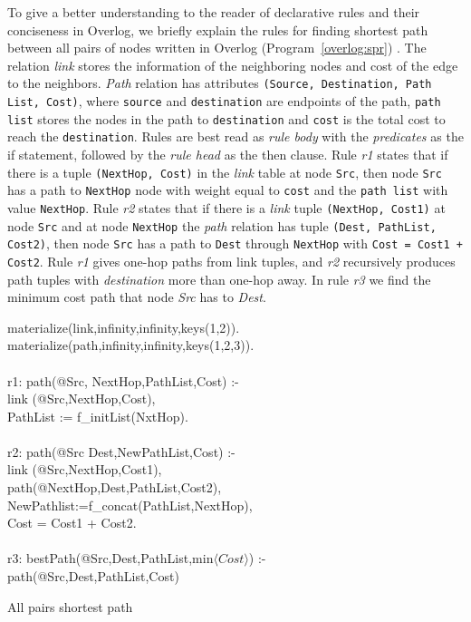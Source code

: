 To give a better understanding to the reader of declarative rules and their conciseness in Overlog, we briefly explain the rules for finding shortest path between all pairs of nodes written in Overlog (Program~\ref{overlog:spr}) . The relation \emph{link} stores the information of the neighboring nodes and cost of the edge to the neighbors. \emph{Path} relation has attributes \texttt{(Source, Destination, Path List, Cost)}, where \texttt{source} and \texttt{destination} are endpoints of the path, \texttt{path list} stores the nodes in the path to \texttt{destination} and \texttt{cost} is the total cost to reach the \texttt{destination}. Rules are best read as \emph{rule body} with the \emph{predicates} as the if statement, followed by the \emph{rule head }as the then clause. Rule \emph{r1} states that if there is a tuple \texttt{(NextHop, Cost)} in the \emph{link} table at node \texttt{Src}, then node \texttt{Src} has a path to \texttt{NextHop} node with weight equal to \texttt{cost} and the \texttt{path list} with value \texttt{NextHop}. Rule \emph{r2} states that if there is a \emph{link} tuple \texttt{(NextHop, Cost1)} at node \texttt{Src} and at node \texttt{NextHop} the \emph{path} relation has tuple \texttt{(Dest, PathList, Cost2)}, then node \texttt{Src} has a path to \texttt{Dest} through \texttt{NextHop} with \texttt{Cost = Cost1 + Cost2}. Rule \emph{r1} gives one-hop paths from link tuples, and \emph{r2} recursively produces path tuples with \emph{destination} more than one-hop away. In rule \emph{r3} we find the minimum cost path that node \emph{Src} has to \emph{Dest}.

\begin{Overlog}
\small{
materialize(link,infinity,infinity,keys(1,2)).\\
materialize(path,infinity,infinity,keys(1,2,3)).\\
\\
r1: path(@Src, NextHop,PathList,Cost) :-\\
\phantom{30} link (@Src,NextHop,Cost),\\
\phantom{30} PathList := f\_initList(NxtHop).\\\\
r2: path(@Src Dest,NewPathList,Cost) :-\\
\phantom{30} link (@Src,NextHop,Cost1),\\
\phantom{30} path(@NextHop,Dest,PathList,Cost2),\\
\phantom{30} NewPathlist:=f\_concat(PathList,NextHop),\\
\phantom{30} Cost = Cost1 + Cost2.\\\\
r3: bestPath(@Src,Dest,PathList,min$\langle Cost \rangle$) :- \\
\phantom{30} path(@Src,Dest,PathList,Cost)\\
}
  \caption{All pairs shortest path}
  \label{overlog:spr}
\end{Overlog}

